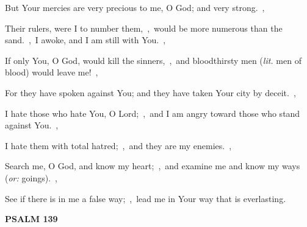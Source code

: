 \documentclass[12pt,twoside,a5paper]{article}
\newcommand{\psalm}[1]{\textbf{PSALM {#1}}\nopagebreak}
\newcommand{\translationoption}[1]{\emph{or:} #1}
\newcommand{\translationliteral}[1]{\emph{lit.} #1}
\begin{document}
\begin{normalparskip}
  But Your mercies are very precious to me, O God; and very strong.~\sep

  Their rulers, were I to number them,~\sep\ would be more numerous than the sand.~\sep\ I awoke, and I am still with You.~\sep

  If only You, O God, would kill the sinners,~\sep\ and bloodthirsty men (\translationliteral{men of blood}) would leave me!~\sep

  For they have spoken against You; and they have taken Your city by deceit.~\sep

  I hate those who hate You, O Lord;~\sep\ and I am angry toward those who stand against You.~\sep

  I hate them with total hatred;~\sep\ and they are my enemies.~\sep

  Search me, O God, and know my heart;~\sep\ and examine me and know my ways (\translationoption{goings}).~\sep

  See if there is in me a false way;~\sep\ lead me in Your way that is everlasting.
\end{normalparskip}

\psalm{139}
\end{document}

